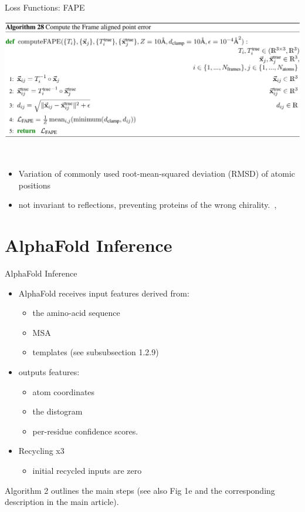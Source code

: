 \documentclass[presentation, smaller]{beamer}
\begin{document}
\begin{frame}[label={sec:org28be407}]{Loss Functions: FAPE}
\begin{center}
\includegraphics[width=.9\linewidth]{./imgs/fape-algo.png}
\end{center}~\cite{jumperHighlyAccurateProtein2021}

\begin{itemize}
\item Variation of commonly used root-mean-squared deviation (RMSD) of atomic positions
\item not invariant to reflections, preventing proteins of the wrong chirality.~\cite{rubieraAlphaFoldHereWhat},~\cite{jumperHighlyAccurateProtein2021}
\end{itemize}
\end{frame}

\section*{AlphaFold Inference}
\label{sec:org02964f4}
\begin{frame}[label={sec:org92ea69c}]{AlphaFold Inference}
\begin{itemize}
\item AlphaFold receives input features derived from:
\begin{itemize}
\item the amino-acid sequence
\item MSA
\item templates (see subsubsection 1.2.9)
\end{itemize}
\item outputs features:
\begin{itemize}
\item atom coordinates
\item the distogram
\item per-residue confidence scores.
\end{itemize}
\item Recycling x3
\begin{itemize}
\item initial recycled inputs are zero
\end{itemize}
\end{itemize}

Algorithm 2 outlines the main steps (see also Fig 1e and the corresponding description in the main article).~\cite{jumperHighlyAccurateProtein2021}
\end{frame}
\end{document}
